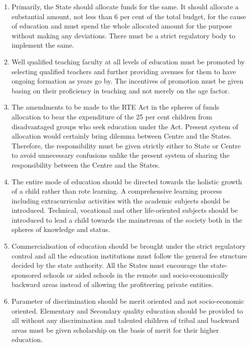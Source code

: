 \begin{multicols}{2}
\begin{enumerate}[label=$-$]
\item Primarily, the State should allocate funds for the same. It should allocate a
substantial amount, not less than 6 per cent of the total budget, for the cause of
education and must spend the whole allocated amount for the purpose without
making any deviations. There must be a strict regulatory body to implement the
same.

\item Well qualified teaching faculty at all levels of education must be promoted by
selecting qualified teachers and further providing avenues for them to have
ongoing formation as years go by. The incentives of promotion must be given
basing on their proficiency in teaching and not merely on the age factor.

\item The amendments to be made to the RTE Act in the spheres of funds allocation to
bear the expenditure of the 25 per cent children from disadvantaged groups who
seek education under the Act. Present system of allocation would certainly bring
dilemma between Centre and the States. Therefore, the responsibility must be
given strictly either to State or Centre to avoid unnecessary confusions unlike the
present system of sharing the responsibility between the Centre and the States.

\item The entire mode of education should be directed towards the holistic growth of a
child rather than rote learning. A comprehensive learning process including extracurricular activities with the academic subjects should be introduced. Technical, vocational and other life-oriented subjects should be introduced to lead a child
towards the mainstream of the society both in the spheres of knowledge and
status.

\item Commercialisation of education should be brought under the strict regulatory
control and all the education institutions must follow the general fee structure
decided by the state authority. All the States must encourage the state-sponsored
schools or aided schools in the remote and socio-economically backward areas
instead of allowing the profiteering private entities.

\item Parameter of discrimination should be merit oriented and not socio-economic
oriented. Elementary and Secondary quality education should be provided to all
without any discrimination and talented children of tribal and backward areas
must be given scholarship on the basis of merit for their higher education.


\end{enumerate}
\end{multicols}
